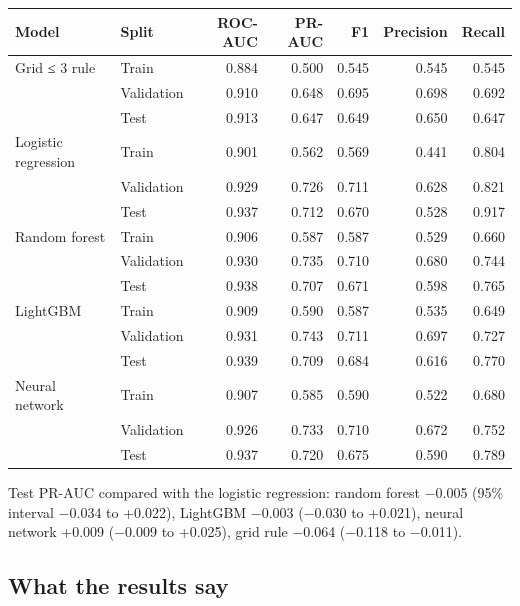 \documentclass[11pt,a4paper]{article}
\begin{document}
{\small
\begin{xltabular}{\linewidth}{>{\raggedright\arraybackslash}X>{\raggedright\arraybackslash}Xrrrrr}
\toprule
\textbf{Model} & \textbf{Split} & \textbf{ROC-AUC} & \textbf{PR-AUC} & \textbf{F1} & \textbf{Precision} & \textbf{Recall} \\
\midrule
\endhead
Grid ≤ 3 rule & Train & 0.884 & 0.500 & 0.545 & 0.545 & 0.545 \\
 & Validation & 0.910 & 0.648 & 0.695 & 0.698 & 0.692 \\
 & Test & 0.913 & 0.647 & 0.649 & 0.650 & 0.647 \\
Logistic regression & Train & 0.901 & 0.562 & 0.569 & 0.441 & 0.804 \\
 & Validation & 0.929 & 0.726 & 0.711 & 0.628 & 0.821 \\
 & Test & 0.937 & 0.712 & 0.670 & 0.528 & 0.917 \\
Random forest & Train & 0.906 & 0.587 & 0.587 & 0.529 & 0.660 \\
 & Validation & 0.930 & 0.735 & 0.710 & 0.680 & 0.744 \\
 & Test & 0.938 & 0.707 & 0.671 & 0.598 & 0.765 \\
LightGBM & Train & 0.909 & 0.590 & 0.587 & 0.535 & 0.649 \\
 & Validation & 0.931 & 0.743 & 0.711 & 0.697 & 0.727 \\
 & Test & 0.939 & 0.709 & 0.684 & 0.616 & 0.770 \\
Neural network & Train & 0.907 & 0.585 & 0.590 & 0.522 & 0.680 \\
 & Validation & 0.926 & 0.733 & 0.710 & 0.672 & 0.752 \\
 & Test & 0.937 & 0.720 & 0.675 & 0.590 & 0.789 \\
\bottomrule
\end{xltabular}
}

Test PR-AUC compared with the logistic regression: random forest −0.005 (95\% interval −0.034 to +0.022), LightGBM −0.003 (−0.030 to +0.021), neural network +0.009 (−0.009 to +0.025), grid rule −0.064 (−0.118 to −0.011).

\subsection{What the results say}
\end{document}
